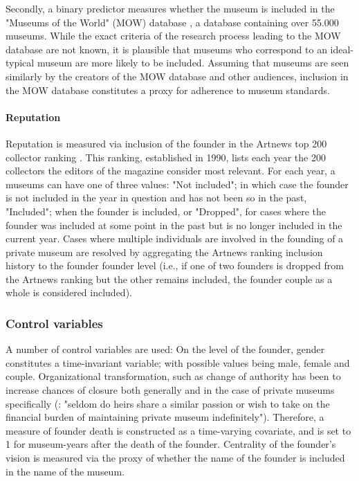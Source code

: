 \documentclass[12pt]{article}
\begin{document}
Secondly, a binary predictor measures whether the museum is included in the "Museums of the World" (MOW) database \parencite{deGruyter_2021_MOW}, a database containing over 55.000 museums.
While the exact criteria of the research process leading to the MOW database are not known, it is plausible that museums who correspond to an ideal-typical museum are more likely to be included.
Assuming that museums are seen similarly by the creators of the MOW database and other audiences, inclusion in the MOW database constitutes a proxy for adherence to museum standards. 


\paragraph*{Reputation}


Reputation is measured via inclusion of the founder in the Artnews top 200 collector ranking \parencite{Artnews_ranking}.
This ranking, established in 1990, lists each year the 200 collectors the editors of the magazine consider most relevant.
For each year, a museums can have one of three values: "Not included"; in which case the founder is not included in the year in question and has not been so in the past, "Included"; when the founder is included, or "Dropped", for cases where the founder was included at some point in the past but is no longer included in the current year.
Cases where multiple individuals are involved in the founding of a private museum are resolved by aggregating the Artnews ranking inclusion history to the founder founder level (i.e., if one of two founders is dropped from the Artnews ranking but the other remains included, the founder couple as a whole is considered included).





\subsubsection*{Control variables}


\bigbreak
\noindent
A number of control variables are used: 
On the level of the founder, gender constitutes a time-invariant variable; with possible values being male, female and couple.
Organizational transformation, such as change of authority has been to increase chances of closure both generally \parencite{Carroll_Khessina_2019_demography} and in the case of private museums specifically (\cite[p.234]{Walker_2019_collector}: "seldom do heirs share a similar passion or wish to take on the financial burden of maintaining private museum indefinitely").
Therefore, a measure of founder death is constructed as a time-varying covariate, and is set to 1 for museum-years after the death of the founder. 
Centrality of the founder's vision is measured via the proxy of whether the name of the founder is included in the name of the museum.
\end{document}
